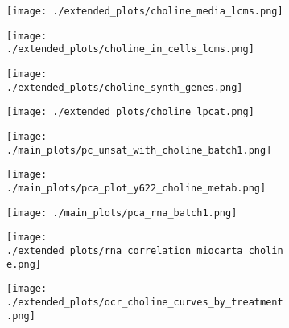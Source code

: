 \begin{figure}[H]
    \begin{subfigure}[t]{.7\textwidth}
        \caption{}
        \texttt{[image: ./extended\_plots/choline\_media\_lcms.png]}        
    \end{subfigure}
    \begin{subfigure}[t]{.3\textwidth}
        \caption{}
        \texttt{[image: ./extended\_plots/choline\_in\_cells\_lcms.png]}        
    \end{subfigure}
    \begin{subfigure}[t]{0.25\textwidth}
        \caption{}
        \texttt{[image: ./extended\_plots/choline\_synth\_genes.png]}        
    \end{subfigure}
    \begin{subfigure}[t]{0.25\textwidth}
        \caption{}
        \texttt{[image: ./extended\_plots/choline\_lpcat.png]}        
    \end{subfigure}
    \begin{subfigure}[t]{.35\textwidth}
        \caption{}
        \texttt{[image: ./main\_plots/pc\_unsat\_with\_choline\_batch1.png]}        
    \end{subfigure} 
    \begin{subfigure}[t]{.25\textwidth}
        \caption{}
        \vspace{.3cm}
        \texttt{[image: ./main\_plots/pca\_plot\_y622\_choline\_metab.png]}        
    \end{subfigure} 
    \begin{subfigure}[t]{0.2\textwidth}
        \caption{}
        \texttt{[image: ./main\_plots/pca\_rna\_batch1.png]}        
    \end{subfigure}  
    \hspace{.25cm}
    \begin{subfigure}[t]{0.2\textwidth}
        \caption{}
        \texttt{[image: ./extended\_plots/rna\_correlation\_miocarta\_choline.png]}        
    \end{subfigure}
    \hspace{.25cm}
    \begin{subfigure}[t]{.25\textwidth}
        \caption{}
        \texttt{[image: ./extended\_plots/ocr\_choline\_curves\_by\_treatment.png]}        
    \end{subfigure}
    \begin{subfigure}[t]{.25\textwidth}

\end{subfigure}
\end{figure}
